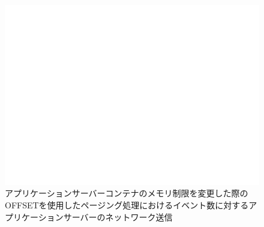 \documentclass[../../../../../main]{subfiles}
\begin{document}
    \begin{figure}[H]
        \centering
        \includegraphics[width=12cm]{graph}
        \caption{アプリケーションサーバーコンテナのメモリ制限を変更した際のOFFSETを使用したページング処理におけるイベント数に対するアプリケーションサーバーのネットワーク送信}
        \label{fig:paging-offset-change-app-memory-limit-app-net-out-app_4_db_1_1024}
    \end{figure}
\end{document}
